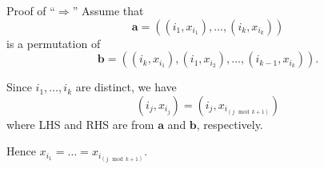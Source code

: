 \documentclass{beamer}
\begin{document}
	\begin{frame}{Proof of ``$\Rightarrow$''}
		Assume that 
			\begin{equation*}
			\mathbf{a} = \left((i_1, x_{i_1}), \dots, (i_k, x_{i_k})\right)
		\end{equation*}
		is a permutation of 
		\begin{equation*}
			\mathbf{b} = \left((i_k, x_{i_1}), (i_1, x_{i_2}), \dots, (i_{k - 1}, x_{i_k})\right).
		\end{equation*}
	
		Since $i_1, \dots, i_k$ are distinct, we have
		\begin{equation*}
			(i_j, x_{i_j}) = (i_j, x_{i_{(j \mod k + 1)}})
		\end{equation*}
		where LHS and RHS are from $\mathbf{a}$ and $\mathbf{b}$, respectively.
		
		Hence $x_{i_1} = \dots = x_{i_{(j \mod k + 1)}}$.
	\end{frame}
\end{document}

